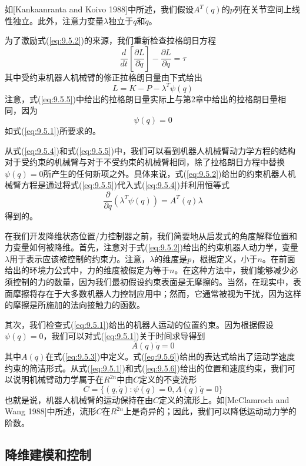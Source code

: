 \documentclass[12pt,a4paper]{ctexart}
\begin{document}
如[Kankaanranta and Koivo 1988]中所述，我们假设$A^T(q)$的$p$列在关节空间上线性独立。此外，注意力变量$\lambda$独立于$q$和$\dot{q}$。

为了激励式(\ref{eq:9.5.2})的来源，我们重新检查拉格朗日方程
\begin{equation}\label{eq:9.5.4}
\frac{d}{dt}\left[\frac{\partial L}{\partial \dot{q}}\right] - \frac{\partial L}{\partial q} = \tau
\end{equation}
其中受约束机器人机械臂的修正拉格朗日量由下式给出
\begin{equation}\label{eq:9.5.5}
L = K - P - \lambda^T \psi(q)
\end{equation}
注意，式(\ref{eq:9.5.5})中给出的拉格朗日量实际上与第2章中给出的拉格朗日量相同，因为
\[
\psi(q) = 0
\]
如式(\ref{eq:9.5.1})所要求的。

从式(\ref{eq:9.5.4})和式(\ref{eq:9.5.5})中，我们可以看到机器人机械臂动力学方程的结构对于受约束的机械臂与对于不受约束的机械臂相同，除了拉格朗日方程中替换$\psi(q) = 0$所产生的任何新项之外。具体来说，式(\ref{eq:9.5.2})给出的约束机器人机械臂方程是通过将式(\ref{eq:9.5.5})代入式(\ref{eq:9.5.4})并利用恒等式
\[
\frac{\partial}{\partial q}(\lambda^T \psi(q)) = A^T(q)\lambda
\]
得到的。

在我们开发降维状态位置/力控制器之前，我们简要地从启发式的角度解释位置和力变量如何被降维。首先，注意对于式(\ref{eq:9.5.2})给出的约束机器人动力学，变量$\lambda$用于表示应该被控制的约束力。注意，$\lambda$的维度是$p$，根据定义，小于$n$。在前面给出的环境力公式中，力的维度被假定为等于$n$。在这种方法中，我们能够减少必须控制的力的数量，因为我们最初假设约束表面是无摩擦的。当然，在现实中，表面摩擦将存在于大多数机器人力控制应用中；然而，它通常被视为干扰，因为这样的摩擦是所施加的法向接触力的函数。

其次，我们检查式(\ref{eq:9.5.1})给出的机器人运动的位置约束。因为根据假设$\psi(q) = 0$，我们可以对式(\ref{eq:9.5.1})关于时间求导得到
\begin{equation}\label{eq:9.5.6}
A(q)\dot{q} = 0
\end{equation}
其中$A(q)$在式(\ref{eq:9.5.3})中定义。式(\ref{eq:9.5.6})给出的表达式给出了运动学速度约束的简洁形式。从式(\ref{eq:9.5.1})和式(\ref{eq:9.5.6})给出的位置和速度约束，我们可以说明机械臂动力学属于在$R^{2n}$中由$C$定义的不变流形
\[
C = \{(q, \dot{q}) : \psi(q) = 0, A(q)\dot{q} = 0\}
\]
也就是说，机器人机械臂的运动保持在由$C$定义的流形上。如[McClamroch and Wang 1988]中所述，流形$C$在$R^{2n}$上是奇异的；因此，我们可以降低运动动力学的阶数。

\subsection{降维建模和控制}
\end{document}
